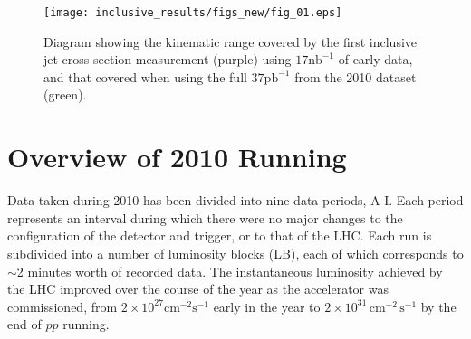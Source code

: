 %
%
%
%
%

\begin{figure}[tbp]
\begin{center}
\texttt{[image: inclusive\_results/figs\_new/fig\_01.eps]}%
\end{center}
\caption[Kinematic range of inclusive jet cross-section measurements]{Diagram showing the kinematic range covered by the first inclusive jet cross-section measurement (purple) using $17\mathrm{nb}^{-1}$ of early data, and that covered when using the full $37\mathrm{pb}^{-1}$ from the 2010 dataset (green).}
\label{fig_kinematic_range}
\end{figure}
\clearpage

\section{Overview of 2010 Running}
\label{sec_2010_overview}


Data taken during 2010 has been divided into nine data periods, A-I. Each period represents an interval during which there were no major changes to the configuration of the detector and trigger, or to that of the LHC.  Each run is subdivided into a number of luminosity blocks (LB), each of which corresponds to $\sim$2 minutes worth of recorded data.
The instantaneous luminosity achieved by the LHC improved over the course of the year as the accelerator was commissioned, from $2 \times 10^{27} \mathrm{cm}^{-2} \mathrm{s}^{-1}$ early in the year to $2 \times 10^{31} \, \mathrm{cm}^{-2}\, \mathrm{s}^{-1}$ by the end of $pp$ running. 



